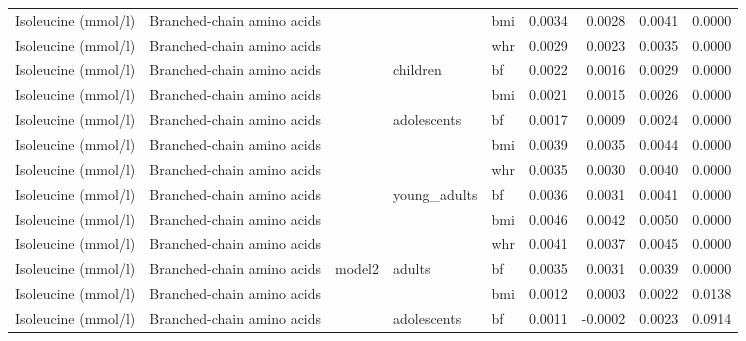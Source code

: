 \documentclass[11pt,twoside]{bristolthesis}
\begin{document}
\begin{longtable}[t]{lllllrrrr}
\cmidrule{1-9}\pagebreak[0]
Isoleucine (mmol/l) & Branched-chain amino acids &  &  & bmi & 0.0034 & 0.0028 & 0.0041 & 0.0000\\
\cmidrule{1-2}
\cmidrule{5-9}\nopagebreak
Isoleucine (mmol/l) & Branched-chain amino acids &  &  & whr & 0.0029 & 0.0023 & 0.0035 & 0.0000\\
\cmidrule{1-2}
\cmidrule{5-9}\nopagebreak
Isoleucine (mmol/l) & Branched-chain amino acids &  & \multirow{-3}{*}{\raggedright\arraybackslash children} & bf & 0.0022 & 0.0016 & 0.0029 & 0.0000\\
\cmidrule{1-2}
\cmidrule{4-9}\nopagebreak
Isoleucine (mmol/l) & Branched-chain amino acids &  &  & bmi & 0.0021 & 0.0015 & 0.0026 & 0.0000\\
\cmidrule{1-2}
\cmidrule{5-9}\nopagebreak
Isoleucine (mmol/l) & Branched-chain amino acids &  & \multirow{-2}{*}{\raggedright\arraybackslash adolescents} & bf & 0.0017 & 0.0009 & 0.0024 & 0.0000\\
\cmidrule{1-2}
\cmidrule{4-9}\nopagebreak
Isoleucine (mmol/l) & Branched-chain amino acids &  &  & bmi & 0.0039 & 0.0035 & 0.0044 & 0.0000\\
\cmidrule{1-2}
\cmidrule{5-9}\nopagebreak
Isoleucine (mmol/l) & Branched-chain amino acids &  &  & whr & 0.0035 & 0.0030 & 0.0040 & 0.0000\\
\cmidrule{1-2}
\cmidrule{5-9}\nopagebreak
Isoleucine (mmol/l) & Branched-chain amino acids &  & \multirow{-3}{*}{\raggedright\arraybackslash young\_adults} & bf & 0.0036 & 0.0031 & 0.0041 & 0.0000\\
\cmidrule{1-2}
\cmidrule{4-9}\nopagebreak
Isoleucine (mmol/l) & Branched-chain amino acids &  &  & bmi & 0.0046 & 0.0042 & 0.0050 & 0.0000\\
\cmidrule{1-2}
\cmidrule{5-9}\nopagebreak
Isoleucine (mmol/l) & Branched-chain amino acids &  &  & whr & 0.0041 & 0.0037 & 0.0045 & 0.0000\\
\cmidrule{1-2}
\cmidrule{5-9}\nopagebreak
Isoleucine (mmol/l) & Branched-chain amino acids & \multirow{-11}{*}{\raggedright\arraybackslash model2} & \multirow{-3}{*}{\raggedright\arraybackslash adults} & bf & 0.0035 & 0.0031 & 0.0039 & 0.0000\\
\cmidrule{1-9}\pagebreak[0]
Isoleucine (mmol/l) & Branched-chain amino acids &  &  & bmi & 0.0012 & 0.0003 & 0.0022 & 0.0138\\
\cmidrule{1-2}
\cmidrule{5-9}\nopagebreak
Isoleucine (mmol/l) & Branched-chain amino acids &  & \multirow{-2}{*}{\raggedright\arraybackslash adolescents} & bf & 0.0011 & -0.0002 & 0.0023 & 0.0914\\

\end{longtable}
\end{document}
